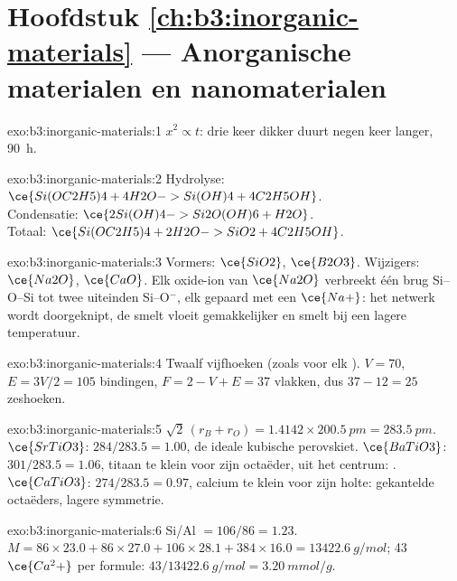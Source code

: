 \section*{Hoofdstuk \ref{ch:b3:inorganic-materials} --- Anorganische materialen en nanomaterialen}

\begin{solution}{exo:b3:inorganic-materials:1}
$x^2 \propto t$: drie keer dikker duurt negen keer langer, \qty{90}{h}.
\end{solution}

\begin{solution}{exo:b3:inorganic-materials:2}
Hydrolyse: $\ce{Si(OC2H5)4 + 4H2O -> Si(OH)4 + 4C2H5OH}$.\\
Condensatie: $\ce{2Si(OH)4 -> Si2O(OH)6 + H2O}$.\\
Totaal: $\ce{Si(OC2H5)4 + 2H2O -> SiO2 + 4C2H5OH}$.
\end{solution}

\begin{solution}{exo:b3:inorganic-materials:3}
Vormers: $\ce{SiO2}$, $\ce{B2O3}$. Wijzigers: $\ce{Na2O}$, $\ce{CaO}$. Elk oxide-ion van $\ce{Na2O}$ verbreekt één brug Si--O--Si
tot twee uiteinden Si--O$^-$, elk gepaard met een $\ce{Na+}$: het netwerk wordt doorgeknipt,
de smelt vloeit gemakkelijker en smelt bij een lagere temperatuur.
\end{solution}

\begin{solution}{exo:b3:inorganic-materials:4}
Twaalf vijfhoeken (zoals voor elk ). $V = 70$, $E = 3V/2 = 105$ bindingen, $F = 2 - V + E = 37$
vlakken, dus $37 - 12 = 25$ zeshoeken.
\end{solution}

\begin{solution}{exo:b3:inorganic-materials:5}
$\sqrt2\,(r_B + r_O) = 1.4142 \times \qty{200.5}{pm} = \qty{283.5}{pm}$. $\ce{SrTiO3}$: $284/283.5 = 1.00$, de ideale kubische perovskiet.
$\ce{BaTiO3}$: $301/283.5 = 1.06$, titaan te klein voor zijn octaëder, uit het centrum: .
$\ce{CaTiO3}$: $274/283.5 = 0.97$, calcium te klein voor zijn holte: gekantelde octaëders,
lagere symmetrie.
\end{solution}

\begin{solution}{exo:b3:inorganic-materials:6}
Si/Al $= 106/86 = 1.23$. $M = 86 \times 23.0 + 86 \times 27.0 + 106 \times 28.1 + 384 \times 16.0 = \qty{13422.6}{g/mol}$; 43 $\ce{Ca^2+}$ per
formule: $43/\qty{13422.6}{g/mol} = \qty{3.20}{mmol/g}$.
\end{solution}

